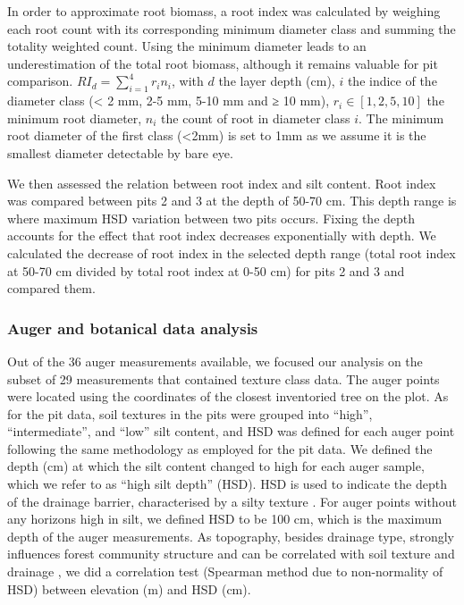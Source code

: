 \documentclass[fleqn,11pt]{latex/stylish_article} %
\begin{document}
In order to approximate root biomass, a root index was calculated by weighing each root count with its corresponding minimum diameter class and summing the totality weighted count. Using the minimum diameter leads to an underestimation of the total root biomass, although it remains valuable for pit comparison.
\(RI_d = \sum_{i=1}^4 r_i n_i\), with \(d\) the layer depth (cm), \(i\) the indice of the diameter class (\textless{} 2 mm, 2-5 mm, 5-10 mm and ≥ 10 mm), \(r_i \in [1, 2, 5, 10]\) the minimum root diameter, \(n_i\) the count of root in diameter class \(i\). The minimum root diameter of the first class (\textless2mm) is set to 1mm as we assume it is the smallest diameter detectable by bare eye.

We then assessed the relation between root index and silt content. Root index was compared between pits 2 and 3 at the depth of 50-70 cm. This depth range is where maximum HSD variation between two pits occurs. Fixing the depth accounts for the effect that root index decreases exponentially with depth. We calculated the decrease of root index in the selected depth range (total root index at 50-70 cm divided by total root index at 0-50 cm) for pits 2 and 3 and compared them.

\hypertarget{auger-and-botanical-data-analysis}{%
\subsubsection{Auger and botanical data analysis}\label{auger-and-botanical-data-analysis}}

Out of the 36 auger measurements available, we focused our analysis on the subset of 29 measurements that contained texture class data. The auger points were located using the coordinates of the closest inventoried tree on the plot. As for the pit data, soil textures in the pits were grouped into \enquote{high}, \enquote{intermediate}, and \enquote{low} silt content, and HSD was defined for each auger point following the same methodology as employed for the pit data. We defined the depth (cm) at which the silt content changed to high for each auger sample, which we refer to as \enquote{high silt depth} (HSD). HSD is used to indicate the depth of the drainage barrier, characterised by a silty texture \citep{ferryGeneseFonctionnementHydrique2003, humbelCaracterisationParMesures1978}. For auger points without any horizons high in silt, we defined HSD to be 100 cm, which is the maximum depth of the auger measurements. As topography, besides drainage type, strongly influences forest community structure \citep{baldeckSoilResourcesTopography2013, ferryHigherTreefallRates2010} and can be correlated with soil texture and drainage \citep{epronSpatialVariationSoil2006}, we did a correlation test (Spearman method due to non-normality of HSD) between elevation (m) and HSD (cm).
\end{document}
